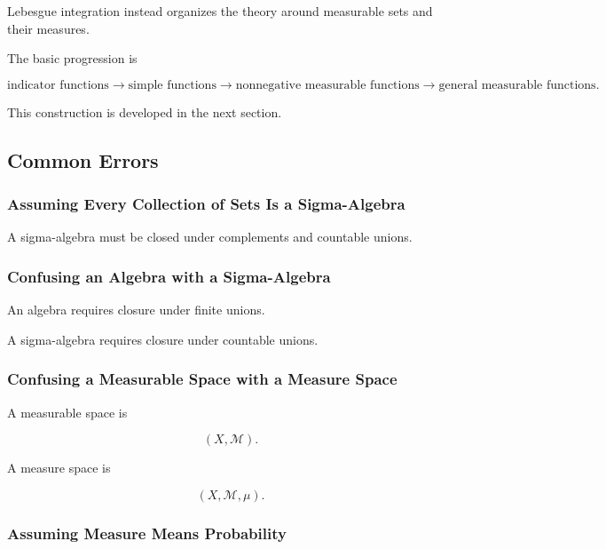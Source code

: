 Lebesgue integration instead organizes the theory around measurable sets
and their measures.

The basic progression is

\[
\boxed{
\text{indicator functions}
\longrightarrow
\text{simple functions}
\longrightarrow
\text{nonnegative measurable functions}
\longrightarrow
\text{general measurable functions}.
}
\]

This construction is developed in the next section.

\subsection{Common Errors}
\label{subsec:measure-theory-common-errors}

\subsubsection{Assuming Every Collection of Sets Is a Sigma-Algebra}

A sigma-algebra must be closed under complements and countable unions.

\subsubsection{Confusing an Algebra with a Sigma-Algebra}

An algebra requires closure under finite unions.

A sigma-algebra requires closure under countable unions.

\subsubsection{Confusing a Measurable Space with a Measure Space}

A measurable space is

\[
(X,\mathcal{M}).
\]

A measure space is

\[
(X,\mathcal{M},\mu).
\]

\subsubsection{Assuming Measure Means Probability}

